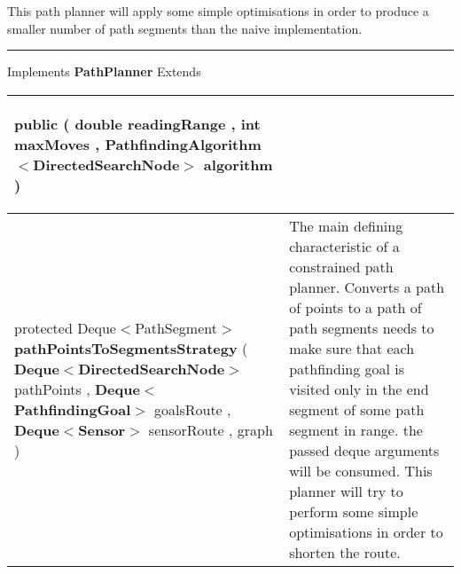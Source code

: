  {\scriptsize This path planner will apply some simple optimisations in order to produce a smaller number of path segments than the naive implementation.
 
\vspace*{4pt} \hrule \vspace*{3pt}
Implements \textbf{ PathPlanner }
Extends \textbf{ \hyperref[tab:BasePathPlanner]{\color{blue}{BasePathPlanner}} }
\vspace*{-5pt} 
\begin{tabularx}{\linewidth}{m{}|m{}}
\label{tab:SimplePathPlanner}
\begin{raggedleft}public  \textbf{\hyperref[tab:SimplePathPlanner]{\color{blue}{SimplePathPlanner}} }(\newline \hfill 
\hspace*{ 5pt} \textbf{double} readingRange , \newline
 \hspace*{ 5pt} \textbf{int} maxMoves , \newline
 \hspace*{ 5pt} \textbf{PathfindingAlgorithm$<$DirectedSearchNode$>$} algorithm  )
\end{raggedleft} &
 \\ \hline 
\begin{raggedleft}protected Deque$<$PathSegment$>$ \textbf{pathPointsToSegmentsStrategy }(\newline \hfill 
\hspace*{ 5pt} \textbf{Deque$<$DirectedSearchNode$>$} pathPoints , \newline
 \hspace*{ 5pt} \textbf{Deque$<$PathfindingGoal$>$} goalsRoute , \newline
 \hspace*{ 5pt} \textbf{Deque$<$Sensor$>$} sensorRoute , \newline
 \hspace*{ 5pt} \textbf{\hyperref[tab:ConstrainedTreeGraph]{\color{blue}{ConstrainedTreeGraph}}} graph  )
\end{raggedleft} &
 The main defining characteristic of a constrained path planner. Converts a path of points to a path of path segments\newline%
 needs to make sure that each pathfinding goal is visited only in the end segment of some path segment in range.\newline%
 the passed deque arguments will be consumed. This planner will try to perform some simple optimisations in order to shorten the route.\newline%

\end{tabularx}}
